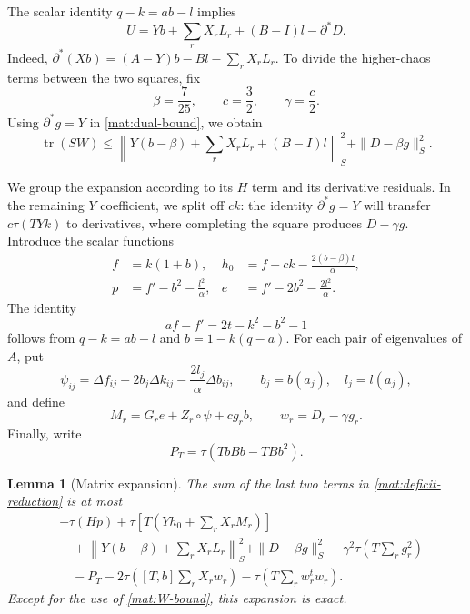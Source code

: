 \documentclass[11pt]{article}
\DeclareMathOperator{\tr}{tr}
\newcommand{\Id}{I}
\newtheorem{lemma}[theorem]{Lemma}
\theoremstyle{definition}
\theoremstyle{remark}
\numberwithin{equation}{section}
\begin{document}
The scalar identity $q-k=ab-l$ implies
\begin{equation}\label{mat:U-representation}
 U=Yb+\sum_rX_rL_r+(B-\Id)l-\partial^*D.
\end{equation}
Indeed,
$\partial^*(Xb)=(A-Y)b-Bl-\sum_rX_rL_r$.
To divide the higher-chaos terms between the two squares, fix
\begin{equation}\label{mat:constants}
 \beta=\frac7{25},\qquad c=\frac32,\qquad \gamma=\frac c2.
\end{equation}
Using $\partial^*g=Y$ in \eqref{mat:dual-bound}, we obtain
\begin{equation}\label{mat:W-bound}
 \tr(SW)\le
 \left\|Y(b-\beta)+\sum_rX_rL_r+(B-\Id)l\right\|_S^2
 +\|D-\beta g\|_S^2.
\end{equation}

We group the expansion according to its $H$ term and its derivative
residuals.  In the remaining $Y$ coefficient, we
split off $ck$: the identity $\partial^*g=Y$ will transfer
$c\tau(TYk)$ to derivatives, where completing the square produces
$D-\gamma g$.  Introduce the scalar functions
\begin{equation}\label{mat:scalar-functions}
 \begin{aligned}
 f&=k(1+b),&
 h_0&=f-ck-\frac{2(b-\beta)l}{\alpha},\\
 p&=f'-b^2-\frac{l^2}{\alpha},&
 e&=f'-2b^2-\frac{2l^2}{\alpha}.
 \end{aligned}
\end{equation}
The identity
\[
 af-f'=2t-k^2-b^2-1
\]
follows from $q-k=ab-l$ and $b=1-k(q-a)$.
For each pair of eigenvalues of $A$, put
\[
 \psi_{ij}=\Delta f_{ij}-2b_j\Delta k_{ij}
                         -\frac{2l_j}{\alpha}\Delta b_{ij},
 \qquad b_j=b(a_j),\quad l_j=l(a_j),
\]
and define
\begin{equation}\label{mat:M-w}
 M_r=G_re+Z_r\circ\psi+cg_rb,\qquad w_r=D_r-\gamma g_r.
\end{equation}
Finally, write
\begin{equation}\label{mat:P-definition}
 P_T=\tau(TbBb-TBb^2).
\end{equation}

\begin{lemma}[Matrix expansion]\label{mat:expansion}
The sum of the last two terms in \eqref{mat:deficit-reduction} is at
most
\begin{align}
 &-\tau(Hp)+\tau\left[T\left(Yh_0+\sum_rX_rM_r\right)\right]
       \label{mat:expanded-bound}\\
 &\quad+\left\|Y(b-\beta)+\sum_rX_rL_r\right\|_S^2
       +\|D-\beta g\|_S^2+\gamma^2\tau\left(T\sum_rg_r^2\right)\nonumber\\
 &\quad-P_T-2\tau\left([T,b]\sum_rX_rw_r\right)
                 -\tau\left(T\sum_rw_r^tw_r\right).\nonumber
\end{align}
Except for the use of \eqref{mat:W-bound}, this expansion is exact.
\end{lemma}
\end{document}
